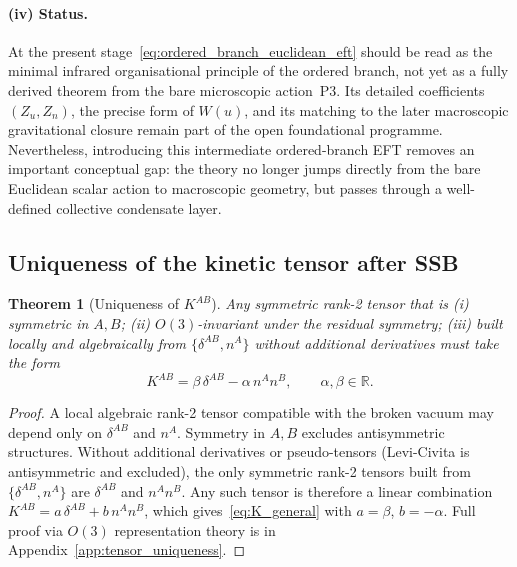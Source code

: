 \documentclass[11pt,a4paper]{article}
\numberwithin{equation}{section}
\newtheorem{theorem}{Theorem}[section]
\begin{document}
\paragraph{(iv) Status.}
At the present stage~\eqref{eq:ordered_branch_euclidean_eft} should
be read as the minimal infrared organisational principle of the ordered
branch, not yet as a fully derived theorem from the bare microscopic
action~P3.
Its detailed coefficients $(Z_u,Z_n)$, the precise form of $W(u)$,
and its matching to the later macroscopic gravitational closure remain
part of the open foundational programme.
Nevertheless, introducing this intermediate ordered-branch EFT removes
an important conceptual gap: the theory no longer jumps directly from
the bare Euclidean scalar action to macroscopic geometry, but passes
through a well-defined collective condensate layer.

\subsection{Uniqueness of the kinetic tensor after SSB}
\label{sec:tensor_uniqueness}

\begin{theorem}[Uniqueness of $K^{AB}$]
\label{thm:tensor_uniqueness}
Any symmetric rank-2 tensor that is
(i) symmetric in $A,B$;
(ii) $O(3)$-invariant under the residual symmetry;
(iii) built locally and algebraically from
     $\{\delta^{AB}, n^A\}$ without additional derivatives
must take the form
\begin{equation}
  \label{eq:K_general}
  K^{AB} = \beta\,\delta^{AB} - \alpha\,n^A n^B,
  \qquad \alpha,\beta\in\mathbb{R}.
\end{equation}
\end{theorem}

\begin{proof}
A local algebraic rank-2 tensor compatible with the broken vacuum
may depend only on $\delta^{AB}$ and $n^A$.
Symmetry in $A,B$ excludes antisymmetric structures.
Without additional derivatives or pseudo-tensors
(Levi-Civita is antisymmetric and excluded),
the only symmetric rank-2 tensors built from $\{\delta^{AB}, n^A\}$
are $\delta^{AB}$ and $n^A n^B$.
Any such tensor is therefore a linear combination
$K^{AB} = a\,\delta^{AB} + b\,n^A n^B$,
which gives~\eqref{eq:K_general} with $a=\beta$, $b=-\alpha$.
Full proof via $O(3)$ representation theory is in
Appendix~\ref{app:tensor_uniqueness}.
\end{proof}
\end{document}
